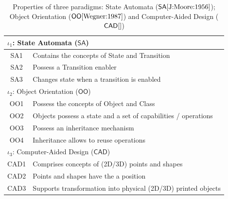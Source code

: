 \begin{table}[t]
   \begin{center}
      \begin{tabular}[t]{c l}
         \hline
         \multicolumn{2}{l}{$\iota_1$: State Automata ($\mathsf{SA}$)}\\
         \hline
         SA1 & Contains the concepts of State and Transition\\
         SA2 & Possess a Transition enabler\\
         SA3 & Changes state when a transition is enabled\\
         \hline\hline
         \multicolumn{2}{l}{$\iota_2$: Object Orientation ($\mathsf{OO}$)}\\
         \hline
         OO1 & Possess the concepts of Object and Class\\
         OO2 & Objects possess a state and a set of capabilities / operations \\
         OO3 & Possess an inheritance mechanism\\
         OO4 & Inheritance allows to reuse operations\\
         \hline\hline
         \multicolumn{2}{l}{$\iota_3$: Computer-Aided Design ($\mathsf{CAD}$)}\\
         \hline
         CAD1 & Comprises concepts of (2D/3D) points and shapes\\
         CAD2 & Points and shapes have the a position\\
         CAD3 & Supports transformation into physical (2D/3D) printed objects\\
         \hline
      \end{tabular}
   \end{center}
   \label{tab:Properties}
   \caption{Properties of three paradigms: State Automata ($\mathsf{SA} 
\cite{J:Moore:1956}$); Object Orientation ($\mathsf{OO} \cite{Wegner:1987}$) 
and Computer-Aided Design ($\mathsf{CAD} \cite{}$)}
\end{table}
